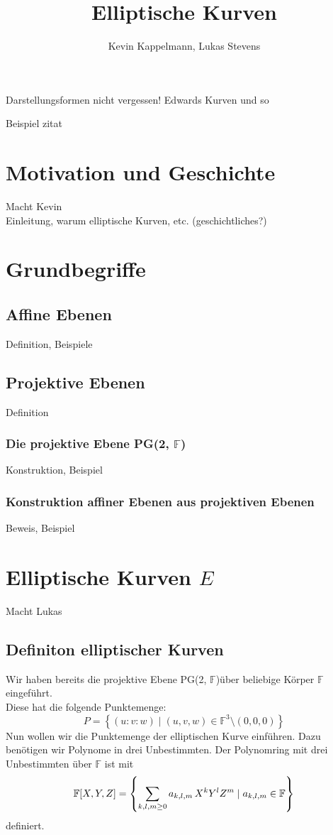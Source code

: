 \documentclass[hidelinks]{article}
\title{Elliptische Kurven}
\author{Kevin Kappelmann, Lukas Stevens}
\newcommand{\pgtwo}{PG(2, $\mathbb{F}$)\thinspace}
\begin{document}
\maketitle
\newpage
\tableofcontents
\newpage

Darstellungsformen nicht vergessen! Edwards Kurven und so

Beispiel zitat
\cite[Kapitel~5, S.~215]{blablubb}

\section{Motivation und Geschichte}
Macht Kevin\\
Einleitung, warum elliptische Kurven, etc. (geschichtliches?)
\section{Grundbegriffe}
\subsection{Affine Ebenen}
Definition, Beispiele
\subsection{Projektive Ebenen}
Definition
\subsubsection{Die projektive Ebene \pgtwo}
Konstruktion, Beispiel
\subsubsection{Konstruktion affiner Ebenen aus projektiven Ebenen}
Beweis, Beispiel
\section{Elliptische Kurven $E$}
Macht Lukas\\
\subsection{Definiton elliptischer Kurven}
Wir haben bereits die projektive Ebene \pgtwo über beliebige Körper $\mathbb{F}$ eingeführt. \\
Diese hat die folgende Punktemenge:
\begin{equation*}
    P = \left\{(u:v:w) \mid (u,v,w) \in \mathbb{F}^3 \setminus (0,0,0) \right\}
\end{equation*}
Nun wollen wir die Punktemenge der elliptischen Kurve einführen. Dazu benötigen wir Polynome in drei Unbestimmten.
Der Polynomring mit drei Unbestimmten über $\mathbb{F}$ ist mit 
\begin{equation*}
    \mathbb{F}[X,Y,Z] = \left\{ \sum_{k,l,m \geq 0} a_{k,l,m} \thinspace X^k Y^l Z^m \mid a_{k,l,m} \in \mathbb{F} \right\}
\end{equation*}
definiert.
\end{document}
